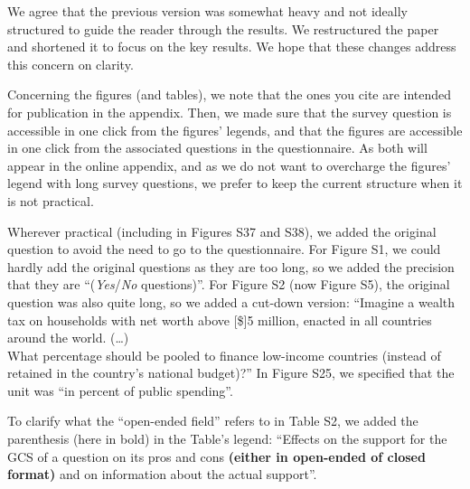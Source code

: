\documentclass[12pt,english]{article}
\begin{document}

We agree that the previous version was somewhat heavy and not ideally structured to guide the reader through the results. We restructured the paper and shortened it to focus on the key results. We hope that these changes address this concern on clarity.

Concerning the figures (and tables), we note that the ones you cite are intended for publication in the appendix. Then, we made sure that the survey question is accessible in one click from the figures' legends, and that the figures are accessible in one click from the associated questions in the questionnaire. As both will appear in the online appendix, and as we do not want to overcharge the figures' legend with long survey questions, we prefer to keep the current structure when it is not practical. 

Wherever practical (including in Figures S37 and S38), we added the original question to avoid the need to go to the questionnaire. For Figure S1, we could hardly add the original questions as they are too long, so we added the precision that they are ``(\textit{Yes}/\textit{No} questions)''. For Figure S2 (now Figure S5), the original question was also quite long, so we added a cut-down version: ``Imagine a wealth tax on households with net worth above [\$]5 million, enacted in all countries around the world.  
(\dots)  \\ What percentage should be pooled to finance low-income countries (instead of retained in the country's national budget)?''
In Figure S25, we specified that the unit was ``in percent of public spending''.

To clarify what the ``open-ended field'' refers to in Table S2, %
we added the parenthesis (here in bold) in the Table's legend: ``Effects on the support for the GCS of a question on its pros and cons \textbf{(either in open-ended of closed format)} and on information about the actual support''.
~\\ ~\\
\end{document}
